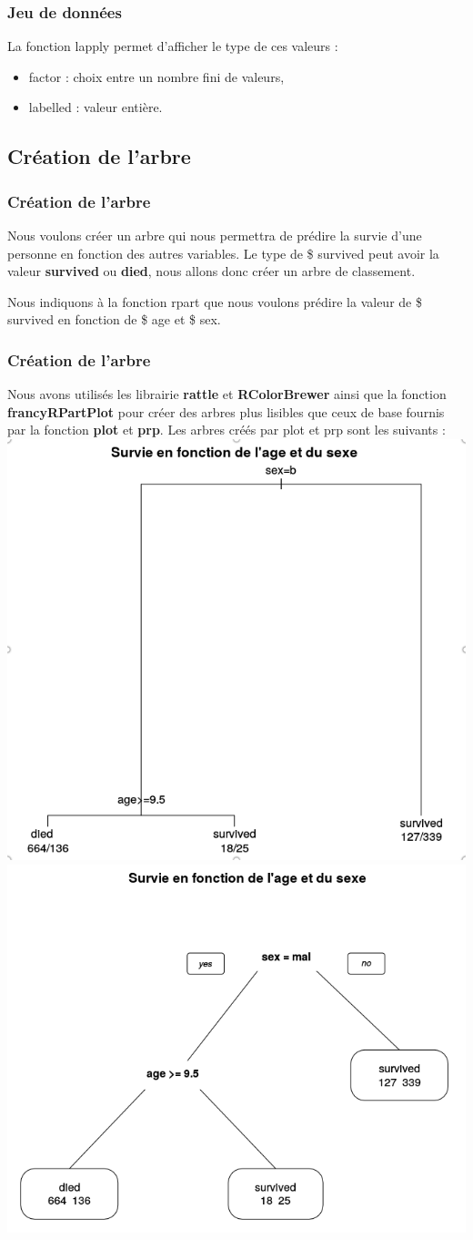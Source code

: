 \documentclass[compress]{beamer}
\begin{document}
\begin{frame}
 \frametitle{Jeu de données}
 La fonction \textrm{lapply} permet d'afficher le type de ces valeurs : 
 \begin{itemize}
  \item factor : choix entre un nombre fini de valeurs,
  \item labelled : valeur entière.
 \end{itemize}
 
\end{frame}

\subsection{Création de l'arbre}
\begin{frame}
\frametitle{Création de l'arbre}
Nous voulons créer un arbre qui nous permettra de prédire la survie d'une personne en fonction des autres variables. Le type de \textrm{\$ survived} peut avoir la valeur 
\textbf{survived} ou \textbf{died}, nous allons donc créer un arbre de classement.\newline

Nous indiquons à la fonction \textrm{rpart} que nous voulons prédire la valeur de \textrm{\$ survived} en fonction de \textrm{\$ age} et \textrm{\$ sex}.\newline

\end{frame}
\begin{frame}
 \frametitle{Création de l'arbre}
Nous avons utilisés les librairie \textbf{rattle} et \textbf{RColorBrewer} ainsi que la fonction \textbf{francyRPartPlot} pour 
créer des arbres plus lisibles que ceux de base fournis par la fonction \textbf{plot} et \textbf{prp}.
Les arbres créés par \textrm{plot} et \textrm{prp} sont les suivants : \\
\includegraphics[width=.5\textwidth,height=1\textheight,keepaspectratio]{img/plot.png}%
\includegraphics[width=.5\textwidth,height=1\textheight,keepaspectratio]{img/prp.png}
\end{frame}
\end{document}
